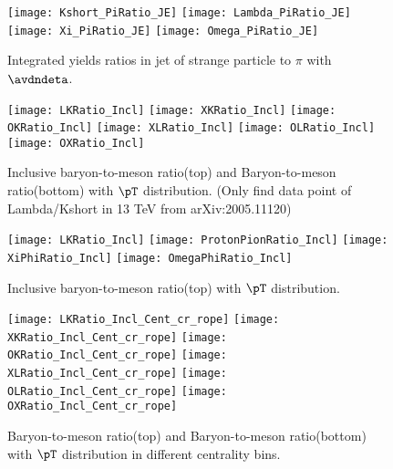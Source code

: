 \begin{figure}[ht]
	\begin{center}
		\texttt{[image: Kshort\_PiRatio\_JE]}
		\texttt{[image: Lambda\_PiRatio\_JE]}
		\texttt{[image: Xi\_PiRatio\_JE]}
		\texttt{[image: Omega\_PiRatio\_JE]}
	\end{center}
	\caption{Integrated yields ratios in jet of strange particle to $\pi$ with $\avdndeta$.}
	\label{fig:JEIntePartoPiRatio}
\end{figure}


\begin{figure}[ht]
        \begin{center}
                \texttt{[image: LKRatio\_Incl]}
                \texttt{[image: XKRatio\_Incl]}
                \texttt{[image: OKRatio\_Incl]}
                \texttt{[image: XLRatio\_Incl]}
                \texttt{[image: OLRatio\_Incl]}
                \texttt{[image: OXRatio\_Incl]}
        \end{center}
	\caption{Inclusive baryon-to-meson ratio(top) and Baryon-to-meson ratio(bottom) with $\pT$ distribution. (Only find data point of Lambda/Kshort in 13 TeV from arXiv:2005.11120)}
        \label{fig:InclParRatio}
\end{figure}

\begin{figure}[ht]
        \begin{center}
                \texttt{[image: LKRatio\_Incl]}
                \texttt{[image: ProtonPionRatio\_Incl]}
                \texttt{[image: XiPhiRatio\_Incl]}
                \texttt{[image: OmegaPhiRatio\_Incl]}
        \end{center}
	\caption{Inclusive baryon-to-meson ratio(top) with $\pT$ distribution.}
        \label{fig:InclBtMratio}
\end{figure}

\begin{figure}[ht]
        \begin{center}
                \texttt{[image: LKRatio\_Incl\_Cent\_cr\_rope]}
                \texttt{[image: XKRatio\_Incl\_Cent\_cr\_rope]}
                \texttt{[image: OKRatio\_Incl\_Cent\_cr\_rope]}
                \texttt{[image: XLRatio\_Incl\_Cent\_cr\_rope]}
                \texttt{[image: OLRatio\_Incl\_Cent\_cr\_rope]}
                \texttt{[image: OXRatio\_Incl\_Cent\_cr\_rope]}
        \end{center}
	\caption{Baryon-to-meson ratio(top) and Baryon-to-meson ratio(bottom) with $\pT$ distribution in different centrality bins.}
        \label{fig:InclParRatioCent}
\end{figure}

